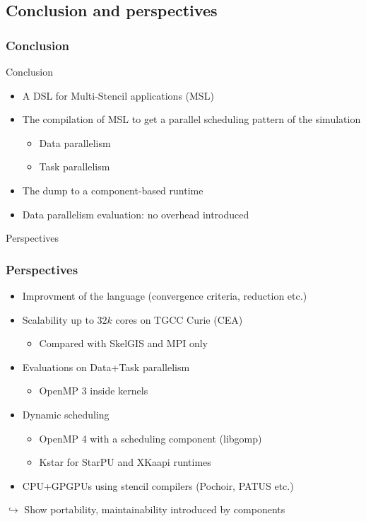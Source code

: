 \documentclass{beamer}
\makeatletter
\newenvironment{withoutheadline}{
        \setbeamertemplate{headline}[default]
        \def\beamer@entrycode{\vspace*{-\headheight}}
    }{}
\makeatother
\begin{document}
\subsection{Conclusion and perspectives}
\begin{frame}
\frametitle{Conclusion}
\begin{block}{Conclusion}
\begin{itemize}
\item A DSL for Multi-Stencil applications (MSL)
\item The compilation of MSL to get a parallel scheduling pattern of the simulation
\begin{itemize}
\item Data parallelism
\item Task parallelism
\end{itemize}
\item The dump to a component-based runtime
\item Data parallelism evaluation: no overhead introduced 
\end{itemize}
\end{block}
\end{frame}

\begin{frame}
\begin{block}{Perspectives}
\frametitle{Perspectives}
\begin{itemize}
\item Improvment of the language (convergence criteria, reduction etc.)
\item Scalability up to $32k$ cores on TGCC Curie (CEA)
\begin{itemize}
\item Compared with SkelGIS and MPI only
\end{itemize}
\item Evaluations on Data+Task parallelism
\begin{itemize}
\item OpenMP 3 inside kernels
\end{itemize}
\item Dynamic scheduling
\begin{itemize}
\item OpenMP 4 with a scheduling component (libgomp)
\item Kstar for StarPU and XKaapi runtimes
\end{itemize}
\item CPU+GPGPUs using stencil compilers (Pochoir, PATUS etc.)
\end{itemize}
$\hookrightarrow$ Show portability, maintainability introduced by components
\end{block}
\end{frame}

\end{document}
